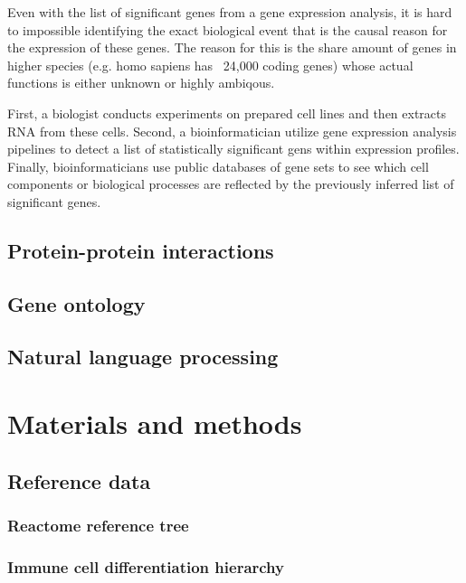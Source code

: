\documentclass{thesisclass}
\begin{document}
Even with the list of significant genes from a gene expression analysis, it is hard to impossible identifying the exact biological event that is the causal reason for the expression of these genes. The reason for this is the share amount of genes in higher species (e.g. homo sapiens has ~24,000 coding genes) whose actual functions is either unknown or highly ambiqous.

First, a biologist conducts experiments on prepared cell lines and then extracts RNA from these cells. 
Second, a bioinformatician utilize gene expression analysis pipelines to detect a list of  statistically significant gens within expression profiles. Finally, bioinformaticians use public databases of gene sets to see which cell components or biological processes are reflected by the previously inferred list of significant genes. 

\section{Protein-protein interactions}

\section{Gene ontology}

\section{Natural language processing}

\chapter{Materials and methods}
\label{ch:methods}

\section{Reference data}

\subsection{Reactome reference tree}

\subsection{Immune cell differentiation hierarchy}
\end{document}
